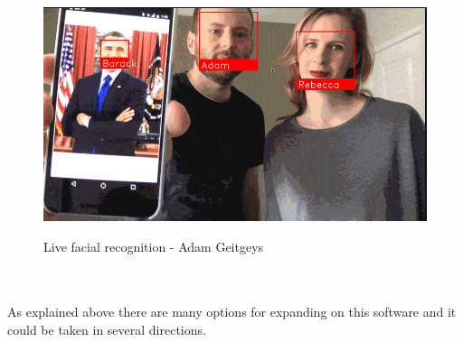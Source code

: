 \documentclass{article}
\begin{document}
\begin{figure}[h!]
\centering
\includegraphics[scale=0.5]{images/facerec.png}
\caption{Live facial recognition - Adam Geitgeys}\cite{ageitgey}
\end{figure}
\\\\
As explained above there are many options for expanding on this software and it could be taken in several directions.

\newpage
\end{document}
